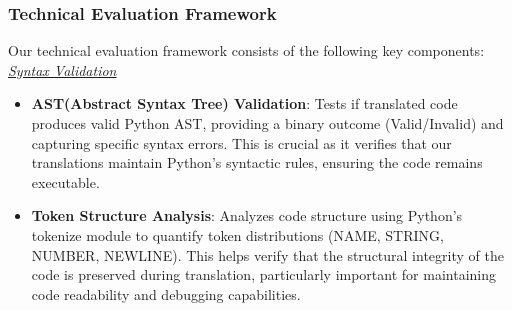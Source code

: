 \documentclass[11pt,a4paper]{article}
\begin{document}
\subsubsection{Technical Evaluation Framework}
Our technical evaluation framework consists of the following key components:\\
\textit{\underline{Syntax Validation}}
\begin{itemize}[itemsep=0pt, topsep=0pt]
    \item \textbf{AST(Abstract Syntax Tree) Validation}: Tests if translated code produces valid Python AST, providing a binary outcome (Valid/Invalid) and capturing specific syntax errors. This is crucial as it verifies that our translations maintain Python's syntactic rules, ensuring the code remains executable.
    \item \textbf{Token Structure Analysis}: Analyzes code structure using Python's tokenize module to quantify token distributions (NAME, STRING, NUMBER, NEWLINE). This helps verify that the structural integrity of the code is preserved during translation, particularly important for maintaining code readability and debugging capabilities.
\end{itemize}
\end{document}
